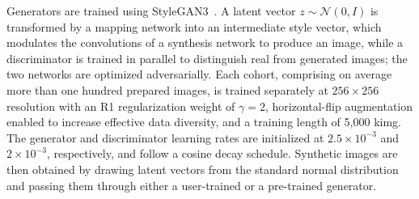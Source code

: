 Generators are trained using StyleGAN3~\cite{stylegan3}. A latent vector
$z \sim \mathcal{N}(0, I)$ is transformed by a mapping network into an
intermediate style vector, which modulates the convolutions of a synthesis
network to produce an image, while a discriminator is trained in parallel to
distinguish real from generated images; the two networks are optimized
adversarially. Each cohort, comprising on average more than one hundred
prepared images, is trained separately at $256\times256$ resolution with an
R1 regularization weight of $\gamma = 2$, horizontal-flip augmentation
enabled to increase effective data diversity, and a training length of
5{,}000 kimg. The generator and discriminator learning rates are initialized
at $2.5\times10^{-3}$ and $2\times10^{-3}$, respectively, and follow a
cosine decay schedule. Synthetic images are then obtained by drawing latent
vectors from the standard normal distribution and passing them through
either a user-trained or a pre-trained generator.
